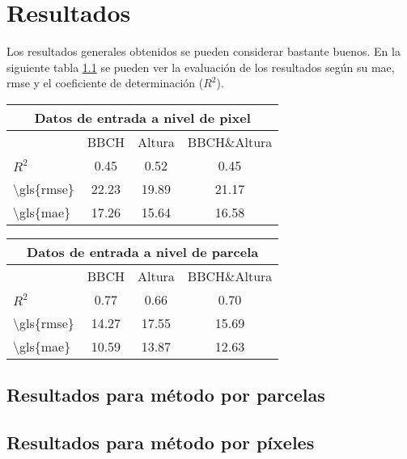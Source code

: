 
\chapter{Resultados}
\label{resultados}
\par Los resultados generales obtenidos se pueden considerar bastante buenos. En la siguiente tabla \ref{tab:error} se pueden ver la evaluación de los resultados según su \gls{mae}, \gls{rmse} y el coeficiente de determinación ($R^2$).

\begin{table}[]\label{tab:error}
\begin{tabular}{lccc}
\multicolumn{4}{c}{Datos de entrada a nivel de pixel}                            \\ \hline
\multicolumn{1}{l|}{}                            & BBCH  & Altura & BBCH\&Altura \\ \cline{2-4} 
\multicolumn{1}{l|}{$R^2$}                       & 0.45  & 0.52   & 0.45         \\
\multicolumn{1}{l|}{\textbackslash{}gls\{rmse\}} & 22.23 & 19.89  & 21.17        \\
\multicolumn{1}{l|}{\textbackslash{}gls\{mae\}}  & 17.26 & 15.64  & 16.58       
\end{tabular}
\end{table}

\begin{table}[]\label{tab:error2}
\begin{tabular}{lccc}
\multicolumn{4}{c}{Datos de entrada a nivel de parcela}                            \\ \hline
\multicolumn{1}{l|}{}                            & BBCH  & Altura & BBCH\&Altura \\ \cline{2-4} 
\multicolumn{1}{l|}{$R^2$}                       & 0.77  & 0.66   & 0.70 \\
\multicolumn{1}{l|}{\textbackslash{}gls\{rmse\}} & 14.27 & 17.55  & 15.69 \\
\multicolumn{1}{l|}{\textbackslash{}gls\{mae\}}  & 10.59 & 13.87  & 12.63       
\end{tabular}
\end{table}

\section{Resultados para método por parcelas}
\section{Resultados para método por píxeles} 

